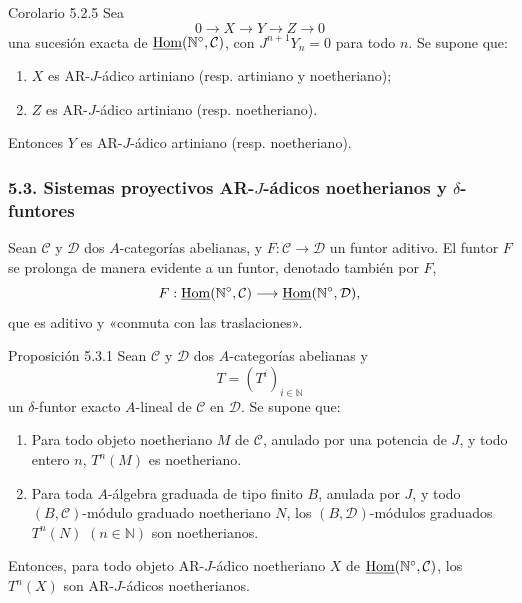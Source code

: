 \begin{statement}{Corolario 5.2.5}
Sea
\[
0\longrightarrow X\longrightarrow Y\longrightarrow Z\longrightarrow0
\]
una sucesión exacta de \(\underline{\operatorname{Hom}}(\mathbb N^\circ,\mathcal C)\), con \(J^{n+1}Y_n=0\) para todo \(n\). Se supone que:
\begin{enumerate}[label=\textup{(\roman*)}]
\item \(X\) es AR-\(J\)-ádico artiniano (resp. artiniano y noetheriano);
\item \(Z\) es AR-\(J\)-ádico artiniano (resp. noetheriano).
\end{enumerate}
Entonces \(Y\) es AR-\(J\)-ádico artiniano (resp. noetheriano).
\end{statement}

\subsubsection*{5.3. Sistemas proyectivos AR-\(J\)-ádicos noetherianos y \(\delta\)-funtores}

Sean \(\mathcal C\) y \(\mathcal D\) dos \(A\)-categorías abelianas, y \(F:\mathcal C\to\mathcal D\) un funtor aditivo. El funtor \(F\) se prolonga de manera evidente a un funtor, denotado también por \(F\),
\[
F:\underline{\operatorname{Hom}}(\mathbb N^\circ,\mathcal C)\longrightarrow\underline{\operatorname{Hom}}(\mathbb N^\circ,\mathcal D),
\]
que es aditivo y «conmuta con las traslaciones».

\begin{statement}{Proposición 5.3.1}
Sean \(\mathcal C\) y \(\mathcal D\) dos \(A\)-categorías abelianas y
\[
T=(T^i)_{i\in\mathbb N}
\]
un \(\delta\)-funtor exacto \(A\)-lineal de \(\mathcal C\) en \(\mathcal D\). Se supone que:
\begin{enumerate}[label=\textup{(\roman*)}]
\item Para todo objeto noetheriano \(M\) de \(\mathcal C\), anulado por una potencia de \(J\), y todo entero \(n\), \(T^n(M)\) es noetheriano.
\item Para toda \(A\)-álgebra graduada de tipo finito \(B\), anulada por \(J\), y todo \((B,\mathcal C)\)-módulo graduado noetheriano \(N\), los \((B,\mathcal D)\)-módulos graduados \(T^n(N)\) \((n\in\mathbb N)\) son noetherianos.
\end{enumerate}
Entonces, para todo objeto AR-\(J\)-ádico noetheriano \(X\) de \(\underline{\operatorname{Hom}}(\mathbb N^\circ,\mathcal C)\), los \(T^n(X)\) son AR-\(J\)-ádicos noetherianos.
\end{statement}
